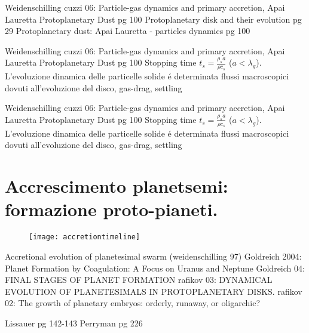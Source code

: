 \begin{workout}
Weidenschilling cuzzi 06: Particle-gas dynamics and primary accretion, Apai Lauretta Protoplanetary Dust pg 100
Protoplanetary disk and their evolution pg 29
Protoplanetary dust: Apai Lauretta - particles dynamics pg 100
\end{workout}

\begin{workout}
Weidenschilling cuzzi 06: Particle-gas dynamics and primary accretion, Apai Lauretta Protoplanetary Dust pg 100
Stopping time $t_s=\frac{\rho_sa}{\rho c_s}$ ($a<\lambda_g$). L'evoluzione dinamica delle particelle solide \'e determinata flussi macroscopici dovuti all'evoluzione del disco, gas-drag, settling
\end{workout}

\begin{workout}
Weidenschilling cuzzi 06: Particle-gas dynamics and primary accretion, Apai Lauretta Protoplanetary Dust pg 100
Stopping time $t_s=\frac{\rho_sa}{\rho c_s}$ ($a<\lambda_g$). L'evoluzione dinamica delle particelle solide \'e determinata flussi macroscopici dovuti all'evoluzione del disco, gas-drag, settling
\end{workout}

\section{Accrescimento planetsemi: formazione proto-pianeti.}


\begin{figure}[!t]
\texttt{[image: accretiontimeline]}
\end{figure}

\begin{workout}
Accretional evolution of planetesimal swarm (weidenschilling 97)
Goldreich 2004: Planet Formation by Coagulation: A Focus on Uranus and Neptune
Goldreich 04: FINAL STAGES OF PLANET FORMATION
rafikov 03: DYNAMICAL EVOLUTION OF PLANETESIMALS IN PROTOPLANETARY DISKS.
rafikov 02: The growth of planetary embryos: orderly, runaway, or oligarchic?
\end{workout}

\begin{workout}[10m-10km, 100km-1000km, 1000km-10000km: refs]
Lissauer pg 142-143
Perryman pg 226
\end{workout}


